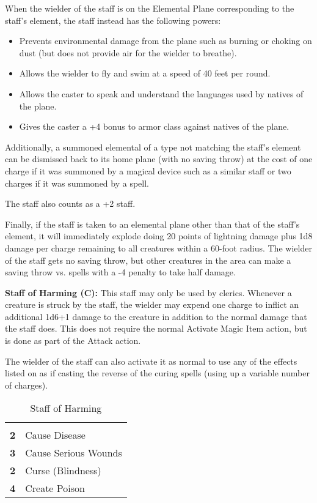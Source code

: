 \begin{multicols*}{2}
When the wielder of the staff is on the Elemental Plane corresponding to the staff’s element, the staff instead has the following powers:

\begin{itemize}
 \item{Prevents environmental damage from the plane such as burning or choking on dust (but does not provide air for the wielder to breathe).}
 \item{Allows the wielder to fly and swim at a speed of 40 feet per round.}
 \item{Allows the caster to speak and understand the languages used by natives of the plane.}
 \item{Gives the caster a +4 bonus to armor class against natives of the plane.}
\end{itemize}

Additionally, a summoned elemental of a type not matching the staff’s element can be dismissed back to its home plane (with no saving throw) at the cost of one charge if it was summoned by a magical device such as a similar staff or two charges if it was summoned by a spell.

The staff also counts as a +2 staff.

Finally, if the staff is taken to an elemental plane other than that of the staff’s element, it will immediately explode doing 20 points of lightning damage plus 1d8 damage per charge remaining to all creatures within a 60-foot radius. The wielder of the staff gets no saving throw, but other creatures in the area can make a saving throw vs. spells with a -4 penalty to take half damage.

\textbf{Staff of Harming (C):} This staff may only be used by clerics. Whenever a creature is struck by the staff, the wielder may expend one charge to inflict an additional 1d6+1 damage to the creature in addition to the normal damage that the staff does. This does not require the normal Activate Magic Item action, but is done as part of the Attack action.

The wielder of the staff can also activate it as normal to use any of the effects listed on  as if casting the reverse of the curing spells (using up a variable number of charges).

\begin {table}[H]
  \caption{Staff of Harming}\label{tab:Staff of Harming}
  \begin{tabularx}{\columnwidth}{>{\bfseries}YY}
	 & \\
	2 & Cause Disease\\
	3 & Cause Serious Wounds\\
	2 & Curse (Blindness)\\
	4 & Create Poison
  \end {tabularx}
\end {table}


\end{multicols*}
